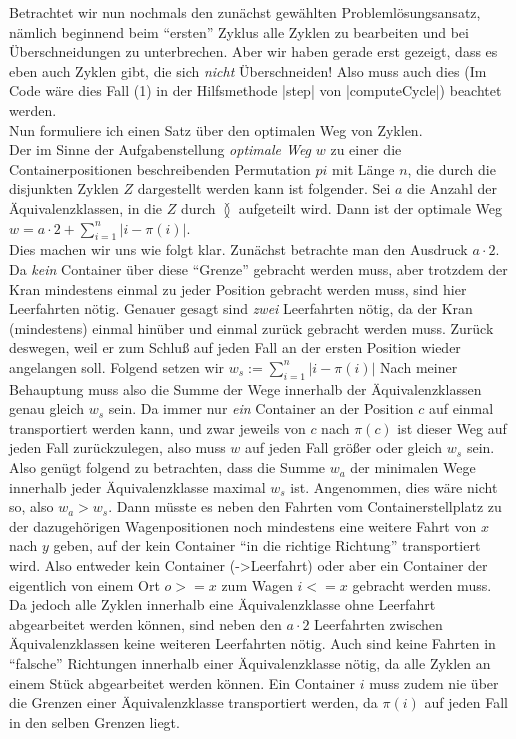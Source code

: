 Betrachtet wir nun nochmals den zunächst gewählten Problemlösungsansatz, nämlich beginnend beim ``ersten'' Zyklus alle Zyklen zu bearbeiten und bei Überschneidungen zu unterbrechen.
Aber wir haben gerade erst gezeigt, dass es eben auch Zyklen gibt, die sich \emph{nicht} Überschneiden!
Also muss auch dies (Im Code wäre dies Fall (1) in der Hilfsmethode |step| von |computeCycle|) beachtet werden.\\
Nun formuliere ich einen Satz über den optimalen Weg von Zyklen.\\
Der im Sinne der Aufgabenstellung \emph{optimale Weg} $w$ zu einer die Containerpositionen beschreibenden Permutation $pi$ mit Länge $n$,
die durch die disjunkten Zyklen $Z$ dargestellt werden kann ist folgender.
Sei $a$ die Anzahl der Äquivalenzklassen, in die $Z$ durch $\between$ aufgeteilt wird.
Dann ist der optimale Weg $w = a \cdot 2 + \sum_{i = 1}^{n}{\lvert i-\pi(i)\rvert}$.\\
Dies machen wir uns wie folgt klar. Zunächst betrachte man den Ausdruck $a \cdot 2$.
Da \emph{kein} Container über diese ``Grenze'' gebracht werden muss, aber trotzdem der Kran mindestens einmal zu jeder Position gebracht werden muss, sind hier Leerfahrten nötig.
Genauer gesagt sind \emph{zwei} Leerfahrten nötig, da der Kran (mindestens) einmal hinüber und einmal zurück gebracht werden muss.
Zurück deswegen, weil er zum Schluß auf jeden Fall an der ersten Position wieder angelangen soll.
Folgend setzen wir $w_s := \sum_{i = 1}^{n}{\lvert i-\pi(i)\rvert}$
Nach meiner Behauptung muss also die Summe der Wege innerhalb der Äquivalenzklassen genau gleich $w_s$ sein.
Da immer nur \emph{ein} Container an der Position $c$ auf einmal transportiert werden kann,
und zwar jeweils von $c$ nach $\pi(c)$ ist dieser Weg auf jeden Fall zurückzulegen, also muss $w$ auf jeden Fall größer oder gleich $w_s$ sein.
Also genügt folgend zu betrachten, dass die Summe $w_a$ der minimalen Wege innerhalb jeder Äquivalenzklasse maximal $w_s$ ist.
Angenommen, dies wäre nicht so, also $w_a > w_s$.
Dann müsste es neben den Fahrten vom Containerstellplatz zu der dazugehörigen Wagenpositionen noch mindestens eine weitere Fahrt von $x$ nach $y$ geben,
auf der kein Container ``in die richtige Richtung'' transportiert wird.
Also entweder kein Container (->Leerfahrt) oder aber ein Container der eigentlich von einem Ort $o >= x$ zum Wagen $i <= x$ gebracht werden muss.
Da jedoch alle Zyklen innerhalb eine Äquivalenzklasse ohne Leerfahrt abgearbeitet werden können,
sind neben den $a \cdot 2$ Leerfahrten zwischen Äquivalenzklassen keine weiteren Leerfahrten nötig.
Auch sind keine Fahrten in ``falsche'' Richtungen innerhalb einer Äquivalenzklasse nötig, da alle Zyklen an einem Stück abgearbeitet werden können. %
Ein Container $i$ muss zudem nie über die Grenzen einer Äquivalenzklasse transportiert werden, da $\pi(i)$ auf jeden Fall in den selben Grenzen liegt.


